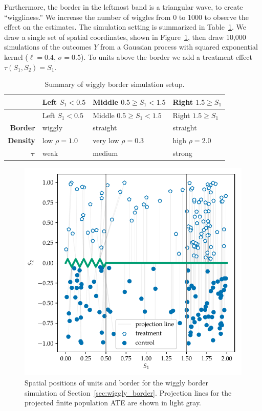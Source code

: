 \documentclass[letter]{article}
\makeatletter
\def\maxwidth{\ifdim\Gin@nat@width>\linewidth\linewidth
\else\Gin@nat@width\fi}
\let\Oldincludegraphics\includegraphics
\renewcommand{\includegraphics}[1]{\Oldincludegraphics[width=0.9\maxwidth]{#1}}
\newcommand{\taubold}{\bm{\tau}}
\makeatother
\begin{document}
Furthermore, the border in the leftmost band is a triangular wave, to create ``wiggliness.''
We increase the number of wiggles from 0 to 1000 to observe the effect on the estimates.
The simulation setting is summarized in Table~\ref{table:wiggly_setup}.
We draw a single set of spatial coordinates, shown in Figure~\ref{fig:wiggly_boundaries_setup}, then draw 10,000 simulations of the outcomes \(Y\) from a Gaussian process with squared exponential kernel (\(\ell=0.4\), \(\sigma=0.5\)).
To units above the border we add a treatment effect \(\tau(S_1, S_2) = S_1\).
    


    	\begin{longtable}[]{@{}rlll@{}}
\caption{Summary of wiggly border simulation setup. \label{table:wiggly_setup}}\tabularnewline
\toprule
& Left \(S_1< 0.5\) & Middle \(0.5 \ge S_1 < 1.5\) & Right \(1.5 \ge S_1\)\tabularnewline
\midrule
\endfirsthead
\toprule
& Left \(S_1< 0.5\) & Middle \(0.5 \ge S_1 < 1.5\) & Right \(1.5 \ge S_1\)\tabularnewline
\midrule
\endhead
\textbf{Border} & wiggly & straight & straight\tabularnewline
\textbf{Density} & low \(\rho=1.0\) & very low \(\rho=0.3\) & high \(\rho=2.0\)\tabularnewline
\(\taubold\) & weak & medium & strong\tabularnewline
\bottomrule
\end{longtable}
    


    	\begin{figure}
\centering
\includegraphics{../figures/wiggly_boundaries_setup.pdf}
\caption{\label{fig:wiggly_boundaries_setup}Spatial positions of units and border for the wiggly border simulation of Section~\ref{sec:wiggly_border}. Projection lines for the projected finite population ATE are shown in light gray.}
\end{figure}
    
\end{document}
